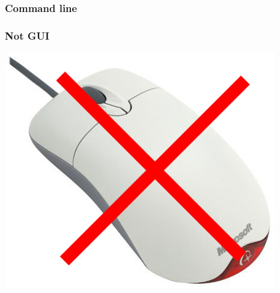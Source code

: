 \documentclass[slides,compress]{beamer}
\begin{document}
\begin{frame}
\frametitle{Command line}
\end{frame}

\begin{frame}
\frametitle{Not GUI}
\begin{center}
\includegraphics[scale=0.40]{figures/no-mouse.jpg}
\end{center}
\end{frame}
\end{document}
